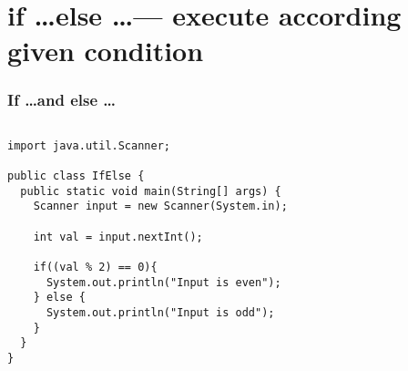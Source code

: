 \documentclass[en, 11pt, xcolor=dvipsnames]{beamer}
\begin{document}
\section{if \dots else \dots --- execute according given condition}
\begin{frame}[fragile]
	\frametitle{If \dots and else \dots}


	\begin{columns}[c]
		\begin{column}{0.9\textwidth}

			\begin{lstlisting}[style=Java]
import java.util.Scanner;

public class IfElse {
  public static void main(String[] args) {
    Scanner input = new Scanner(System.in);

    int val = input.nextInt();

    if((val % 2) == 0){
      System.out.println("Input is even");
    } else {
      System.out.println("Input is odd");
    }
  }
}\end{lstlisting}

		\end{column}
	\end{columns}

\end{frame}
\end{document}
